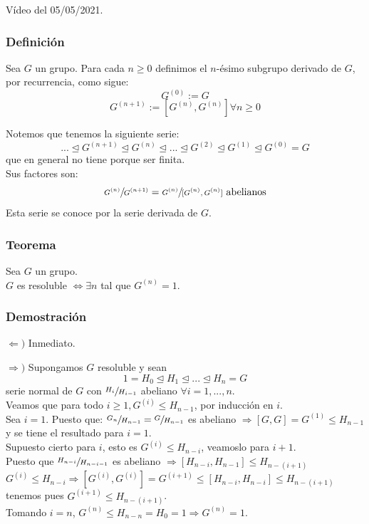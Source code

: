 \documentclass[11pt,a4paper]{article}
\begin{document}
Vídeo del 05/05/2021.

\subsubsection*{Definición}

Sea $G$ un grupo. Para cada $n \geq 0$ definimos el $n$-ésimo subgrupo derivado de $G$, por recurrencia, como sigue:
$$G^{(0)} := G$$
$$G^{(n+1)} := [G^{(n)}, G^{(n)}] \forall n \geq 0$$

Notemos que tenemos la siguiente serie:
$$... \unlhd G^{(n+1)} \unlhd G^{(n)} \unlhd ... \unlhd G^{(2)} \unlhd G^{(1)} \unlhd G^{(0)} = G$$
que en general no tiene porque ser finita. \\
Sus factores son:
$$\sfrac{G^{(n)}}{G^{(n+1)}} = \sfrac{G^{(n)}}{[G^{(n)},G^{(n)}]} \text{ abelianos}$$
Esta serie se conoce por la serie derivada de $G$.

\subsubsection*{Teorema}

Sea $G$ un grupo. \\
$G$ es resoluble $\iff \exists n$ tal que $G^{(n)} = 1$.

\subsubsection*{Demostración}

\begin{enumerate*}
\item[$\Leftarrow)$] Inmediato.
\item[$\Rightarrow)$] Supongamos $G$ resoluble y sean
$$1 = H_{0} \unlhd H_{1} \unlhd ... \unlhd H_{n} = G$$
serie normal de $G$ con $\sfrac{H_{i}}{H_{i-1}}$ abeliano $\forall i = 1, ..., n$. \\
Veamos que para todo $i \geq 1, G^{(i)} \leqslant H_{n-1}$, por inducción en $i$. \\
Sea $i = 1$. Puesto que:
$\sfrac{G_{n}}{H_{n-1}} = \sfrac{G}{H_{n-1}}$ es abeliano $\Rightarrow [G,G] = G^{(1)} \leqslant H_{n-1}$ y se tiene el resultado para $i = 1$. \\
Supuesto cierto  para $i$, esto es $G^{(i)} \leqslant H_{n-i}$, veamoslo para $i+1$. \\
Puesto que $\sfrac{H_{n-i}}{H_{n-i-1}}$ es abeliano $\Rightarrow [H_{n-i}, H_{n-1}] \leqslant H_{n-(i+1)}$ \\
$G^{(i)} \leqslant H_{n-i} \Rightarrow [G^{(i)}, G^{(i)}] = G^{(i+1)} \leqslant [H_{n-i}, H_{n-i}] \leqslant H_{n-(i+1)}$ \\
tenemos pues $G^{(i+1)} \leqslant H_{n-(i+1)}$. \\
Tomando $i = n$, $G^{(n)} \leqslant H_{n-n} = H_{0} = 1 \Rightarrow G^{(n)} = 1$.
\end{enumerate*}
\end{document}
